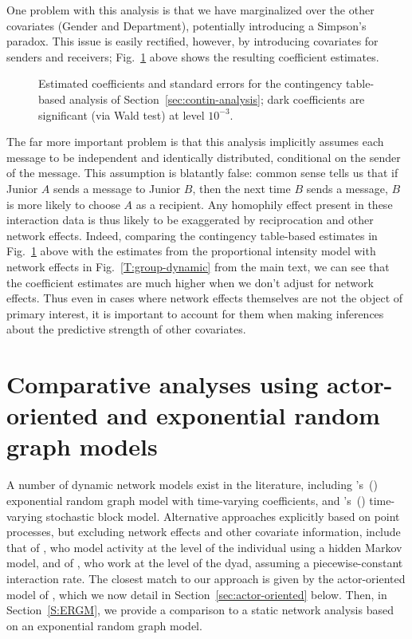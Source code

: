 \documentclass[final]{statsoc}
\begin{document}
One problem with this analysis is that we have marginalized over the
other covariates (Gender and Department), potentially introducing a Simpson's
paradox.  This issue is easily rectified, however, by introducing covariates for senders and
receivers;
Fig.~\ref{T:group-static} above shows the resulting coefficient estimates.

\begin{figure}
  \centering
  \makebox[\textwidth]{
    
  }
  \caption{
    Estimated coefficients and standard errors for the contingency table-based analysis of Section~\ref{sec:contin-analysis}; dark coefficients are significant (via Wald test) at
    level $10^{-3}$.
  }
  \label{T:group-static}
\end{figure}

The far more important
problem is that this analysis implicitly assumes each message to be
independent and identically distributed, conditional on the sender of
the message.  This assumption is blatantly false: common sense tells us that if Junior $A$ sends a message
to Junior $B$, then the next time $B$ sends a message, $B$ is more likely to
choose $A$ as a recipient.  Any homophily effect present in these interaction
data is thus likely to be exaggerated by reciprocation and other network effects.  Indeed,
comparing the contingency table-based estimates in Fig.~\ref{T:group-static} above
with the estimates from the proportional intensity model with network effects
in Fig.~\ref{T:group-dynamic} from the main text, we can see that the coefficient estimates are
much higher when we don't adjust for network effects.  Thus even in cases where network effects themselves
are not the object of primary interest, it is important to account for them when
making inferences about the predictive strength of other covariates.


\section{Comparative analyses using actor-oriented and exponential random graph models}
\label{S:actor-ergm-comparison}

A number of dynamic network models exist in the literature, including
's~(\citeyear{hanneke2010discrete})
exponential random graph model with time-varying coefficients,  and
's~(\citeyear{kolar2010estimating})
time-varying stochastic block model.  Alternative approaches explicitly based
on point processes, but excluding network effects and other covariate
information, include that of \citet{malmgen2009characterizing}, who model
activity at the level of the individual using a hidden Markov model, and of
\citet{heard2010bayesian}, who work at the level of the dyad, assuming a
piecewise-constant interaction rate.  The closest match to our approach is
given by the actor-oriented model of
\citet{snijders2001statistical,snijders2005models}, which we now detail in
Section~\ref{sec:actor-oriented} below.
Then, in Section~\ref{S:ERGM}, we provide a comparison to a static network
analysis based on an exponential random graph model.
\end{document}

